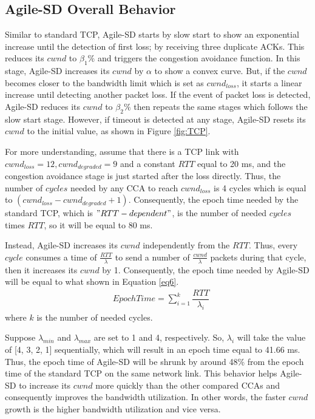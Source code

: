 \documentclass[preprint,3p,times,twocolumn,authoryear]{elsarticle}
\begin{document}
\subsection{Agile-SD Overall Behavior}

Similar to standard TCP, Agile-SD starts by slow start to show an exponential increase until the detection of first loss; by receiving three duplicate ACKs. This reduces its $cwnd$ to $\beta_1\%$ and triggers the congestion avoidance function. In this stage, Agile-SD increases its $cwnd$ by $\alpha$ to show a convex curve. But, if the $cwnd$ becomes closer to the bandwidth limit which is set as $cwnd_{loss}$, it starts a linear increase until detecting another packet loss. If the event of packet loss is detected, Agile-SD reduces its $cwnd$ to $\beta_2\%$ then repeats the same stages which follows the slow start stage. However, if timeout is detected at any stage, Agile-SD resets its $cwnd$ to the initial value, as shown in Figure \ref{fig:TCP}.

For more understanding, assume that there is a TCP link with $cwnd_{loss} = 12, cwnd_{degraded} = 9$ and a constant $RTT$ equal to 20 ms, and the congestion avoidance stage is just started after the loss directly. Thus, the number of $cycles$ needed by any CCA to reach $cwnd_{loss}$ is 4 cycles which is equal to $(cwnd_{loss} - cwnd_{degraded} + 1)$. Consequently, the epoch time needed by the standard TCP, which is $"RTT-dependent"$, is the number of needed $cycles$ times $RTT$, so it will be equal to 80 ms. 

Instead, Agile-SD increases its $cwnd$ independently from the $RTT$. Thus, every $cycle$ consumes a time of $\frac{RTT}{\lambda}$ to send a number of $\frac{cwnd}{\lambda}$ packets during that cycle, then it increases its $cwnd$ by 1. Consequently, the epoch time needed by Agile-SD will be equal to what shown in Equation \eqref{eq6}.
\begin{align}
&Epoch Time = \sum_{i=1}^{k}\dfrac{RTT}{\lambda_i}  \label{eq6}
\end{align}
where $k$ is the number of needed cycles. 

Suppose $\lambda_{min}$ and $\lambda_{max}$ are set to 1 and 4, respectively. So, $\lambda_i$ will take the value of [4, 3, 2, 1] sequentially, which will result in an epoch time equal to 41.66 ms. Thus, the epoch time of Agile-SD will be shrunk by around 48\% from the epoch time of the standard TCP on the same network link. This behavior helps Agile-SD to increase its $cwnd$ more quickly than the other compared CCAs and consequently improves the bandwidth utilization. In other words, the faster $cwnd$ growth is the higher bandwidth utilization and vice versa. 
\end{document}

